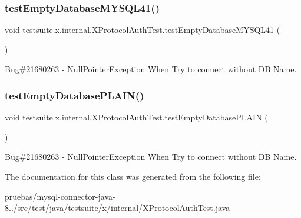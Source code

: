 \subsubsection{\texorpdfstring{test\+Empty\+Database\+M\+Y\+S\+Q\+L41()}{testEmptyDatabaseMYSQL41()}}
{\footnotesize\ttfamily void testsuite.\+x.\+internal.\+X\+Protocol\+Auth\+Test.\+test\+Empty\+Database\+M\+Y\+S\+Q\+L41 (\begin{DoxyParamCaption}{ }\end{DoxyParamCaption})}

Bug\#21680263 -\/ Null\+Pointer\+Exception When Try to connect without DB Name. \mbox{\label{classtestsuite_1_1x_1_1internal_1_1_x_protocol_auth_test_a0399a6526726159d237bed0441d195c2}} 
\subsubsection{\texorpdfstring{test\+Empty\+Database\+P\+L\+A\+I\+N()}{testEmptyDatabasePLAIN()}}
{\footnotesize\ttfamily void testsuite.\+x.\+internal.\+X\+Protocol\+Auth\+Test.\+test\+Empty\+Database\+P\+L\+A\+IN (\begin{DoxyParamCaption}{ }\end{DoxyParamCaption})}

Bug\#21680263 -\/ Null\+Pointer\+Exception When Try to connect without DB Name. 

The documentation for this class was generated from the following file\+:\begin{DoxyCompactItemize}
\item 
pruebas/mysql-\/connector-\/java-\/8../src/test/java/testsuite/x/internal/X\+Protocol\+Auth\+Test.\+java\end{DoxyCompactItemize}
